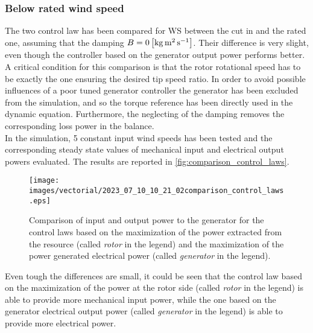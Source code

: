 \subsubsection{Below rated wind speed}
The two control law has been compared for WS between the cut in and the rated one, assuming that the damping $B=0 \left[\si{\kilo\gram\square\meter\per\second}\right]$. Their difference is very slight, even though the controller based on the generator output power performs better.\\
A critical condition for this comparison is that the rotor rotational speed has to be exactly the one ensuring the desired tip speed ratio. In order to avoid possible influences of a poor tuned generator controller the generator has been excluded from the simulation, and so the torque reference has been directly used in the dynamic equation. Furthermore, the neglecting of the damping removes the corresponding loss power in the balance. \\
In the simulation, 5 constant input wind speeds has been tested and the corresponding steady state values of mechanical input and electrical output powers evaluated. The results are reported in \autoref{fig:comparison_control_laws}.
\begin{figure}[htb]
  \centering
  \texttt{[image: images/vectorial/2023\_07\_10\_10\_21\_02comparison\_control\_laws.eps]}
  \caption{Comparison of input and output power to the generator for the control laws based on the maximization of the power extracted from the resource (called \textit{rotor} in the legend) and the maximization of the power generated electrical power (called \textit{generator} in the legend).}
  \label{fig:comparison_control_laws}
\end{figure}

Even tough the differences are small, it could be seen that the control law based on the maximization of the power at the rotor side (called \textit{rotor} in the legend) is able to provide more mechanical input power, while the one based on the generator electrical output power (called \textit{generator} in the legend) is able to provide more electrical power.
